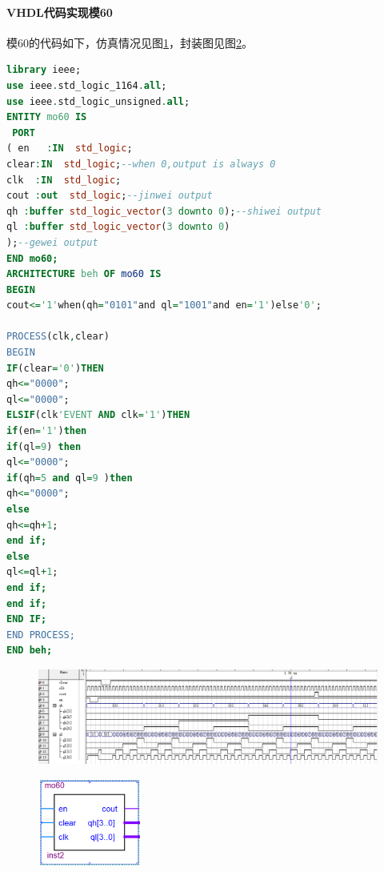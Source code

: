 \documentclass[12pt]{article}
\begin{document}
\paragraph{VHDL代码实现模60}模60的代码如下，仿真情况见图\ref{fig:fangzhenmo60}，封装图见图\ref{fig:fengzhuangmo60}。
\begin{lstlisting}[language=VHDL]
library ieee;
use ieee.std_logic_1164.all;
use ieee.std_logic_unsigned.all;
ENTITY mo60 IS 
 PORT
( en   :IN  std_logic;
clear:IN  std_logic;--when 0,output is always 0
clk  :IN  std_logic;
cout :out  std_logic;--jinwei output
qh :buffer std_logic_vector(3 downto 0);--shiwei output
ql :buffer std_logic_vector(3 downto 0)
);--gewei output
END mo60;
ARCHITECTURE beh OF mo60 IS
BEGIN
cout<='1'when(qh="0101"and ql="1001"and en='1')else'0'; 

PROCESS(clk,clear)
BEGIN
IF(clear='0')THEN
qh<="0000";
ql<="0000";
ELSIF(clk'EVENT AND clk='1')THEN
if(en='1')then
if(ql=9) then
ql<="0000";
if(qh=5 and ql=9 )then
qh<="0000";
else
qh<=qh+1;
end if;
else
ql<=ql+1;
end if;
end if;
END IF;
END PROCESS;
END beh;
\end{lstlisting} 
\begin{figure}[hp]
	\centering  
	\includegraphics[width=\textwidth]{picture/TIM20181210205015.png} 
	\caption{}
	\label{fig:fangzhenmo60}   
\end{figure}
\begin{figure}[hp]
	\centering  
	\includegraphics[width=0.3\textwidth]{picture/fenzhuangmo60.png} 
	\caption{}
	\label{fig:fengzhuangmo60}   
\end{figure}\par
\end{document}
